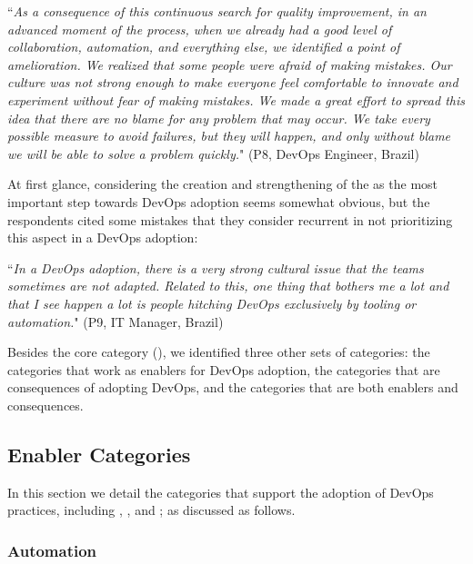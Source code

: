 \begin{mq}
``\emph{As a consequence of this continuous search for quality improvement, in an
advanced moment of the process, when we already had a good level of
collaboration, automation, and everything else, we identified a point of
amelioration. We realized that some people were afraid of making mistakes. Our
culture was not strong enough to make everyone feel comfortable to innovate and
experiment without fear of making mistakes. We made a great effort to spread
this idea that there are no blame for any problem that may occur. We take every possible
measure to avoid failures, but they
will happen, and only without blame we will be able to solve a problem quickly.}" (P8,
DevOps Engineer, Brazil)
\end{mq}

At first glance, considering the creation and strengthening of the  as the most important step towards DevOps adoption seems somewhat obvious, but
the respondents cited some mistakes that they consider recurrent in not
prioritizing this aspect in a DevOps adoption:

\begin{mq}``\emph{In a DevOps adoption, there is a very strong cultural issue that the teams
sometimes are not adapted. Related to this, one thing that bothers me a lot and
that I see happen a lot is people hitching DevOps exclusively by tooling or
automation.}" (P9, IT Manager, Brazil)
\end{mq}

Besides the core category (), we identified
three other sets of categories: the categories that work as enablers
for DevOps adoption, the categories that are consequences of adopting
DevOps, and the categories that are both enablers and consequences.

\subsection{Enabler Categories}

In this section we detail the categories that support the adoption of
DevOps practices, including , , and ;
as discussed as follows.

\subsubsection*{{\bf Automation}} \label{ssec:automation}

